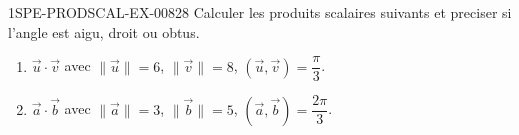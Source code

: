 \begin{exercice}{1SPE-PRODSCAL-EX-008}{2}{8}
Calculer les produits scalaires suivants et preciser si l'angle est aigu, droit ou obtus.
\begin{enumerate}
  \item $\vec{u} \cdot \vec{v}$ avec $\|\vec{u}\| = 6$, $\|\vec{v}\| = 8$, $(\vec{u}, \vec{v}) = \dfrac{\pi}{3}$.
  \item $\vec{a} \cdot \vec{b}$ avec $\|\vec{a}\| = 3$, $\|\vec{b}\| = 5$, $(\vec{a}, \vec{b}) = \dfrac{2\pi}{3}$.
\end{enumerate}
\end{exercice}
